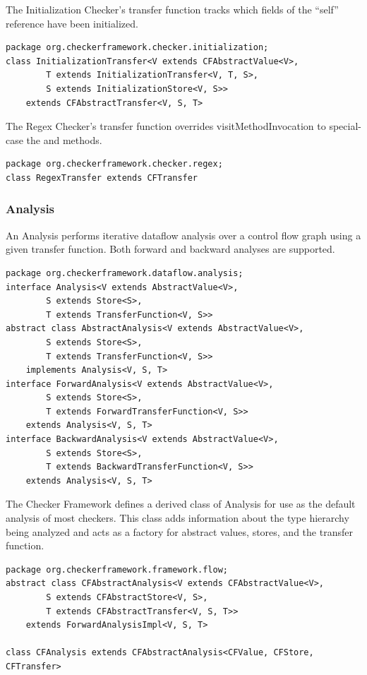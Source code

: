 The Initialization Checker's transfer function tracks which fields of
the ``self'' reference have been initialized.

\begin{verbatim}
package org.checkerframework.checker.initialization;
class InitializationTransfer<V extends CFAbstractValue<V>,
        T extends InitializationTransfer<V, T, S>,
        S extends InitializationStore<V, S>>
    extends CFAbstractTransfer<V, S, T>
\end{verbatim}

The Regex Checker's transfer function overrides visitMethodInvocation
to special-case the  and  methods.

\begin{verbatim}
package org.checkerframework.checker.regex;
class RegexTransfer extends CFTransfer
\end{verbatim}


\subsubsection{Analysis}
\label{sec:analysis_classes}

An Analysis performs iterative dataflow analysis over a control flow
graph using a given transfer function.  Both forward and backward
analyses are supported.

\begin{verbatim}
package org.checkerframework.dataflow.analysis;
interface Analysis<V extends AbstractValue<V>,
        S extends Store<S>,
        T extends TransferFunction<V, S>>
abstract class AbstractAnalysis<V extends AbstractValue<V>,
        S extends Store<S>,
        T extends TransferFunction<V, S>>
    implements Analysis<V, S, T>
interface ForwardAnalysis<V extends AbstractValue<V>,
        S extends Store<S>,
        T extends ForwardTransferFunction<V, S>>
    extends Analysis<V, S, T>
interface BackwardAnalysis<V extends AbstractValue<V>,
        S extends Store<S>,
        T extends BackwardTransferFunction<V, S>>
    extends Analysis<V, S, T>
\end{verbatim}

The Checker Framework defines a derived class of Analysis for use as
the default analysis of most checkers.  This class adds information
about the type hierarchy being analyzed and acts as a factory for
abstract values, stores, and the transfer function.

\begin{verbatim}
package org.checkerframework.framework.flow;
abstract class CFAbstractAnalysis<V extends CFAbstractValue<V>,
        S extends CFAbstractStore<V, S>,
        T extends CFAbstractTransfer<V, S, T>>
    extends ForwardAnalysisImpl<V, S, T>

class CFAnalysis extends CFAbstractAnalysis<CFValue, CFStore, CFTransfer>
\end{verbatim}

